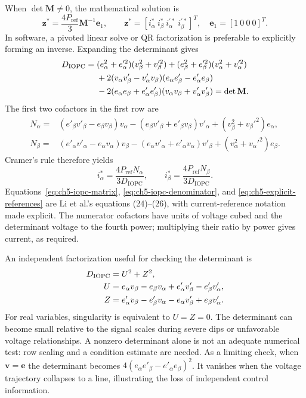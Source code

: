 When $\det\mathbf M\ne0$, the mathematical solution is
\begin{equation}
\mathbf z^\ast=\frac{4P_{\mathrm{ref}}}{3}\mathbf M^{-1}\mathbf e_1,\qquad
\mathbf z^\ast=[i_\alpha^\ast\ i_\beta^\ast\ i_\alpha^{\prime\ast}\ i_\beta^{\prime\ast}]^T,
\quad \mathbf e_1=[1\ 0\ 0\ 0]^T.
\label{eq:ch5-matrix-solution}
\end{equation}
In software, a pivoted linear solve or QR factorization is preferable to explicitly forming an inverse. Expanding the determinant gives
\begin{align}
D_{\mathrm{IOPC}}={}&(e_\alpha^2+e_\alpha'^2)(v_\beta^2+v_\beta'^2)
 +(e_\beta^2+e_\beta'^2)(v_\alpha^2+v_\alpha'^2)\notag\\
&+2(v_\alpha v'_\beta-v'_\alpha v_\beta)
       (e_\alpha e'_\beta-e'_\alpha e_\beta)\notag\\
&-2(e_\alpha e_\beta+e'_\alpha e'_\beta)
       (v_\alpha v_\beta+v'_\alpha v'_\beta)
=\det\mathbf M.
\label{eq:ch5-iopc-denominator}
\end{align}
The first two cofactors in the first row are
\begin{align}
N_\alpha={}&(e'_\beta v'_\beta-e_\beta v_\beta)v_\alpha
 -(e_\beta v'_\beta+e'_\beta v_\beta)v'_\alpha
 +(v_\beta^2+v_\beta'^2)e_\alpha,
\label{eq:ch5-nalpha}\\
N_\beta={}&(e'_\alpha v'_\alpha-e_\alpha v_\alpha)v_\beta
 -(e_\alpha v'_\alpha+e'_\alpha v_\alpha)v'_\beta
 +(v_\alpha^2+v_\alpha'^2)e_\beta.
\label{eq:ch5-nbeta}
\end{align}
Cramer's rule therefore yields
\begin{equation}
\boxed{i_\alpha^\ast=\frac{4P_{\mathrm{ref}}N_\alpha}{3D_{\mathrm{IOPC}}},\qquad
i_\beta^\ast=\frac{4P_{\mathrm{ref}}N_\beta}{3D_{\mathrm{IOPC}}}.}
\label{eq:ch5-explicit-references}
\end{equation}
Equations~\eqref{eq:ch5-iopc-matrix}, \eqref{eq:ch5-iopc-denominator}, and \eqref{eq:ch5-explicit-references} are Li et al.'s equations (24)--(26), with current-reference notation made explicit. The numerator cofactors have units of voltage cubed and the determinant voltage to the fourth power; multiplying their ratio by power gives current, as required.

An independent factorization useful for checking the determinant is
\begin{align}
D_{\mathrm{IOPC}}&=U^2+Z^2,\notag\\
U&=e_\alpha v_\beta-e_\beta v_\alpha+e'_\alpha v'_\beta-e'_\beta v'_\alpha,\notag\\
Z&=e'_\alpha v_\beta-e'_\beta v_\alpha-e_\alpha v'_\beta+e_\beta v'_\alpha.
\label{eq:ch5-det-factorization}
\end{align}
For real variables, singularity is equivalent to $U=Z=0$. The determinant can become small relative to the signal scales during severe dips or unfavorable voltage relationships. A nonzero determinant alone is not an adequate numerical test: row scaling and a condition estimate are needed. As a limiting check, when $\mathbf v=\mathbf e$ the determinant becomes $4(e_\alpha e'_\beta-e'_\alpha e_\beta)^2$. It vanishes when the voltage trajectory collapses to a line, illustrating the loss of independent control information.

